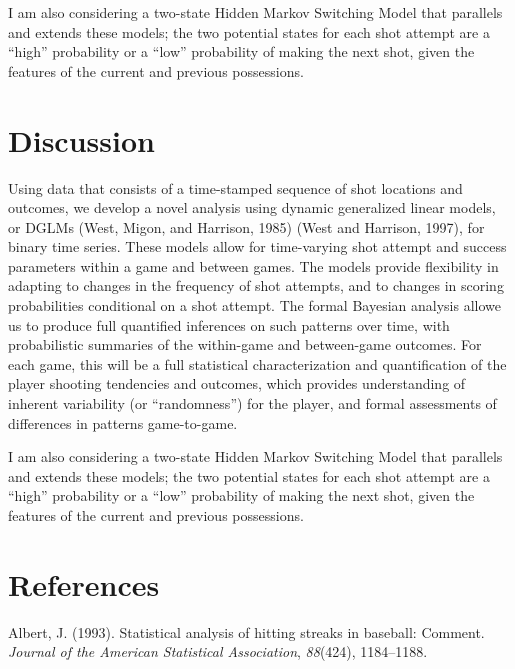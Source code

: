 \documentclass[12pt,twoside]{dukestatscithesis}
\theoremstyle{definition}
\theoremstyle{definition}
\theoremstyle{definition}
\theoremstyle{remark}
\begin{document}
I am also considering a two-state Hidden Markov Switching Model that
parallels and extends these models; the two potential states for each
shot attempt are a ``high'' probability or a ``low'' probability of
making the next shot, given the features of the current and previous
possessions.

\chapter{Discussion}\label{disc}

Using data that consists of a time-stamped sequence of shot locations
and outcomes, we develop a novel analysis using dynamic generalized
linear models, or DGLMs (West, Migon, and Harrison, 1985) (West and
Harrison, 1997), for binary time series. These models allow for
time-varying shot attempt and success parameters within a game and
between games. The models provide flexibility in adapting to changes in
the frequency of shot attempts, and to changes in scoring probabilities
conditional on a shot attempt. The formal Bayesian analysis allowe us to
produce full quantified inferences on such patterns over time, with
probabilistic summaries of the within-game and between-game outcomes.
For each game, this will be a full statistical characterization and
quantification of the player shooting tendencies and outcomes, which
provides understanding of inherent variability (or ``randomness'') for
the player, and formal assessments of differences in patterns
game-to-game.

I am also considering a two-state Hidden Markov Switching Model that
parallels and extends these models; the two potential states for each
shot attempt are a ``high'' probability or a ``low'' probability of
making the next shot, given the features of the current and previous
possessions.

\backmatter

\chapter*{References}\label{references}


\noindent

\setlength{\parindent}{-0.20in} \setlength{\leftskip}{0.20in}
\setlength{\parskip}{8pt}

\hypertarget{refs}{}
\hypertarget{ref-albert93}{}
Albert, J. (1993). Statistical analysis of hitting streaks in baseball:
Comment. \emph{Journal of the American Statistical Association},
\emph{88}(424), 1184--1188.
\end{document}
